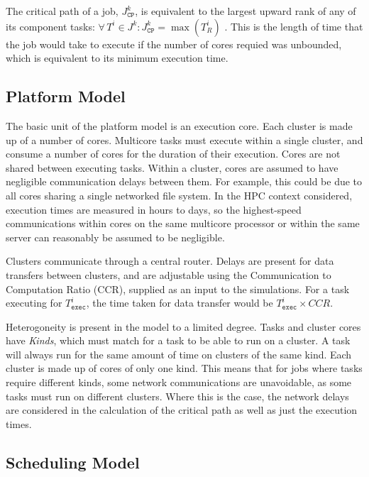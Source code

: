 \documentclass[english,british]{IEEEtran}
\begin{document}
The critical path \cite{kelley61} of a job, $J_{\mathtt{CP}}^{k}$,
is equivalent to the largest upward rank of any of its component tasks:
$\forall\,T^{i}\in J_{\mathtt{}}^{k}:J_{\mathtt{CP}}^{k}=\max\left(T_{R}^{i}\right)$
\cite{Topcuoglu2002}. This is the length of time that the job would
take to execute if the number of cores requied was unbounded, which
is equivalent to its minimum execution time. 


\subsection{Platform Model}

The basic unit of the platform model is an execution core. Each cluster
is made up of a number of cores. Multicore tasks must execute within
a single cluster, and consume a number of cores for the duration of
their execution. Cores are not shared between executing tasks. Within
a cluster, cores are assumed to have negligible communication delays
between them. For example, this could be due to all cores sharing
a single networked file system. In the HPC context considered, execution
times are measured in hours to days, so the highest-speed communications
within cores on the same multicore processor or within the same server
can reasonably be assumed to be negligible.

Clusters communicate through a central router. Delays are present
for data transfers between clusters, and are adjustable using the
Communication to Computation Ratio (CCR), supplied as an input to
the simulations. For a task executing for $T_{\mathtt{exec}}^{i}$,
the time taken for data transfer would be $T_{\mathtt{exec}}^{i}\times CCR$.

Heterogoneity is present in the model to a limited degree. Tasks and
cluster cores have \emph{Kinds}, which must match for a task to be
able to run on a cluster. A task will always run for the same amount
of time on clusters of the same kind. Each cluster is made up of cores
of only one kind. This means that for jobs where tasks require different
kinds, some network communications are unavoidable, as some tasks
must run on different clusters. Where this is the case, the network
delays are considered in the calculation of the critical path as well
as just the execution times.


\subsection{Scheduling Model}
\end{document}
